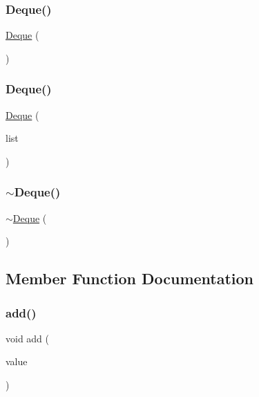 \subsubsection{\texorpdfstring{Deque()}{Deque()}\hspace{0.1cm}{\footnotesize\ttfamily [1/2]}}
{\footnotesize\ttfamily \mbox{\hyperlink{classDeque}{Deque}} (\begin{DoxyParamCaption}{ }\end{DoxyParamCaption})}

\mbox{\label{classDeque_a68fd6ae6ef9283c882d90c6924e932cd}} 
\subsubsection{\texorpdfstring{Deque()}{Deque()}\hspace{0.1cm}{\footnotesize\ttfamily [2/2]}}
{\footnotesize\ttfamily \mbox{\hyperlink{classDeque}{Deque}} (\begin{DoxyParamCaption}\item[{std\+::initializer\+\_\+list$<$ Value\+Type $>$}]{list }\end{DoxyParamCaption})}

\mbox{\label{classDeque_a9d75ae227f70523957cb9b60283d9390}} 
\subsubsection{\texorpdfstring{$\sim$\+Deque()}{~Deque()}}
{\footnotesize\ttfamily $\sim$\mbox{\hyperlink{classDeque}{Deque}} (\begin{DoxyParamCaption}{ }\end{DoxyParamCaption})\hspace{0.3cm}{\ttfamily [virtual]}}



\subsection{Member Function Documentation}
\mbox{\label{classDeque_ab901606bf3a8019c986f0cf9a9f298dc}} 
\subsubsection{\texorpdfstring{add()}{add()}}
{\footnotesize\ttfamily void add (\begin{DoxyParamCaption}\item[{const Value\+Type \&}]{value }\end{DoxyParamCaption})}

